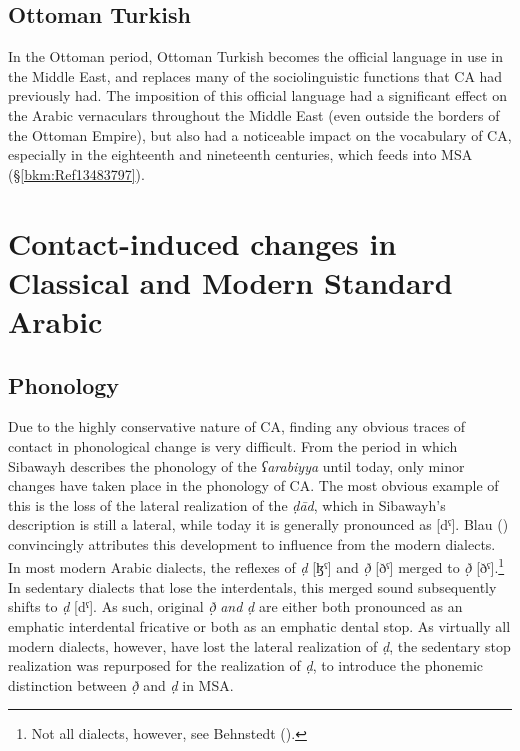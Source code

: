 \documentclass[output=paper]{langsci/langscibook}
\begin{document}
\subsection{Ottoman Turkish}

In the Ottoman period, Ottoman Turkish becomes the official language in use in the Middle East, and replaces many of the sociolinguistic functions that CA had previously had. The imposition of this official language had a significant effect on the Arabic vernaculars throughout the Middle East (even outside the borders of the Ottoman Empire), but also had a noticeable impact on the vocabulary of CA, especially in the eighteenth and nineteenth centuries, which feeds into MSA (§\ref{bkm:Ref13483797}).

\section{Contact-induced changes in Classical and Modern Standard Arabic}
\subsection{\label{bkm:Ref12953419}Phonology}

Due to the highly conservative nature of CA, finding any obvious traces of contact in phonological change is very difficult. From the period in which Sibawayh describes the phonology of the \textit{ʕarabiyya} until today, only minor changes have taken place in the phonology of CA. The most obvious example of this is the loss of the lateral realization of the \textit{ḍād}, which in Sibawayh’s description is still a lateral, while today it is generally pronounced as [dˤ]. Blau (\citeyear[162--163]{Blau1969}) convincingly attributes this development to influence from the modern dialects. In most modern Arabic dialects, the reflexes of \textit{ḍ} [ɮˤ] and \textit{ð̣} [ðˤ] merged to \textit{ð̣} [ðˤ].\footnote{Not all dialects, however, see Behnstedt (\citeyear[16ff.]{Behnstedt2016Yemen}).} In sedentary dialects that lose the interdentals, this merged sound subsequently shifts to \textit{ḍ} [dˤ]. As such, original \textit{ð̣} \textit{and} \textit{ḍ} are either both pronounced as an emphatic interdental fricative or both as an emphatic dental stop. As virtually all modern dialects, however, have lost the lateral realization of \textit{ḍ}, the sedentary stop realization was repurposed for the realization of \textit{ḍ}, to introduce the phonemic distinction between \textit{ð̣} and \textit{ḍ} in MSA.
\end{document}
